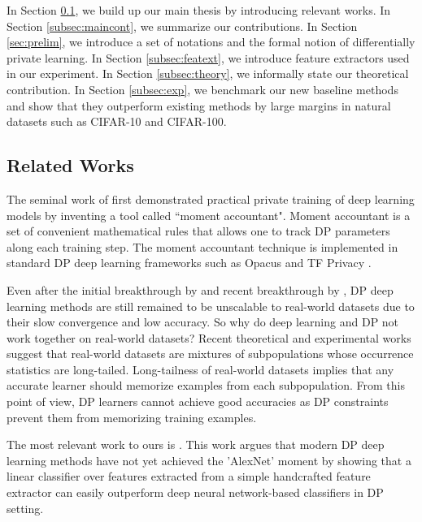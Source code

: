 \documentclass{article}
\theoremstyle{definition}
\begin{document}
In Section \ref{subsec:related}, we build up our main thesis by introducing relevant works. In Section \ref{subsec:maincont}, we summarize our contributions. In Section \ref{sec:prelim}, we introduce a set of notations and the formal notion of differentially private learning. In Section \ref{subsec:featext}, we introduce feature extractors used in our experiment. In Section \ref{subsec:theory}, we informally state our theoretical contribution. In Section \ref{subsec:exp}, we benchmark our new baseline methods and show that they outperform existing methods by large margins in natural datasets such as CIFAR-10 and CIFAR-100.

\subsection{Related Works}
\label{subsec:related}
The seminal work of \cite{abadi2016deep} first demonstrated practical private training of deep learning models by inventing a tool called ``moment accountant". Moment accountant is a set of convenient mathematical rules that allows one to track DP parameters along each training step. The moment accountant technique is implemented in standard DP deep learning frameworks such as Opacus \cite{yousefpour2021opacus} and TF Privacy \cite{abadi2016tensorflow}.

Even after the initial breakthrough by \cite{abadi2016deep} and recent breakthrough by \cite{luo2021scalable}, DP deep learning methods are still remained to be unscalable to real-world datasets due to their slow convergence and low accuracy. So why do deep learning and DP not work together on real-world datasets? Recent theoretical \cite{feldman2020does, brown2021memorization} and experimental works \cite{feldman2020neural} suggest that real-world datasets are mixtures of subpopulations whose occurrence statistics are long-tailed. Long-tailness of real-world datasets implies that any accurate learner should memorize examples from each subpopulation. From this point of view, DP learners cannot achieve good accuracies as DP constraints prevent them from memorizing training examples. 

The most relevant work to ours is \cite{tramer2020differentially}. This work argues that modern DP deep learning methods have not yet achieved the 'AlexNet' moment by showing that a linear classifier over features extracted from a simple handcrafted feature extractor \cite{oyallon2015deep} can easily outperform deep neural network-based classifiers in DP setting.
\end{document}
